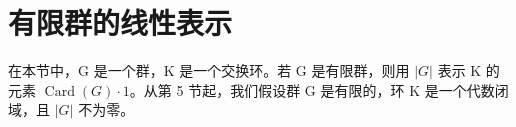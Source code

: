 \section{有限群的线性表示}

在本节中，G 是一个群，K 是一个交换环。若 G 是有限群，则用 \(|G|\) 表示 K 的元素 \(\operatorname{Card}(G) \cdot 1\)。从第 5 节起，我们假设群 G 是有限的，环 K 是一个代数闭域，且 \(|G|\) 不为零。

